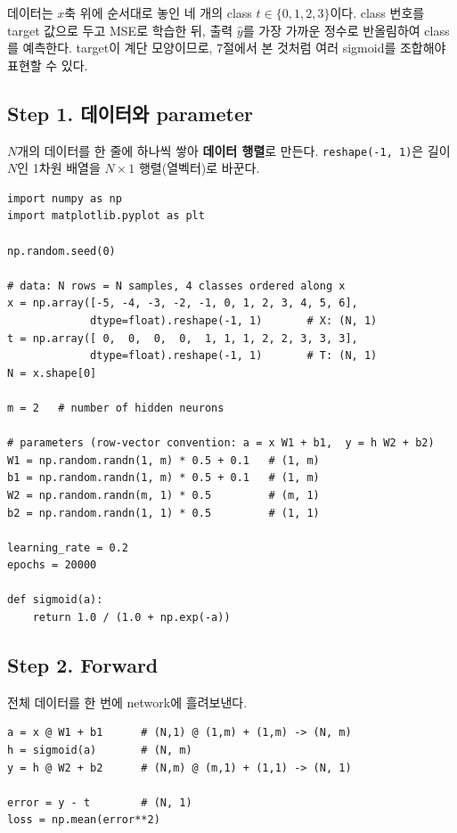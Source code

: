 \documentclass[11pt,a4paper]{article}
\begin{document}
데이터는 $x$축 위에 순서대로 놓인 네 개의 class $t\in\{0,1,2,3\}$이다.
class 번호를 target 값으로 두고 MSE로 학습한 뒤,
출력 $\widehat y$를 가장 가까운 정수로 반올림하여 class를 예측한다.
target이 계단 모양이므로,
7절에서 본 것처럼 여러 sigmoid를 조합해야 표현할 수 있다.

\subsection{Step 1. 데이터와 parameter}

$N$개의 데이터를 한 줄에 하나씩 쌓아 \textbf{데이터 행렬}로 만든다.
\texttt{reshape(-1, 1)}은 길이 $N$인 1차원 배열을 $N\times1$ 행렬(열벡터)로 바꾼다.

\begin{lstlisting}
import numpy as np
import matplotlib.pyplot as plt

np.random.seed(0)

# data: N rows = N samples, 4 classes ordered along x
x = np.array([-5, -4, -3, -2, -1, 0, 1, 2, 3, 4, 5, 6],
             dtype=float).reshape(-1, 1)       # X: (N, 1)
t = np.array([ 0,  0,  0,  0,  1, 1, 1, 2, 2, 3, 3, 3],
             dtype=float).reshape(-1, 1)       # T: (N, 1)
N = x.shape[0]

m = 2   # number of hidden neurons

# parameters (row-vector convention: a = x W1 + b1,  y = h W2 + b2)
W1 = np.random.randn(1, m) * 0.5 + 0.1   # (1, m)
b1 = np.random.randn(1, m) * 0.5 + 0.1   # (1, m)
W2 = np.random.randn(m, 1) * 0.5         # (m, 1)
b2 = np.random.randn(1, 1) * 0.5         # (1, 1)

learning_rate = 0.2
epochs = 20000

def sigmoid(a):
    return 1.0 / (1.0 + np.exp(-a))
\end{lstlisting}

\subsection{Step 2. Forward}

전체 데이터를 한 번에 network에 흘려보낸다.

\begin{lstlisting}
a = x @ W1 + b1      # (N,1) @ (1,m) + (1,m) -> (N, m)
h = sigmoid(a)       # (N, m)
y = h @ W2 + b2      # (N,m) @ (m,1) + (1,1) -> (N, 1)

error = y - t        # (N, 1)
loss = np.mean(error**2)
\end{lstlisting}
\end{document}
